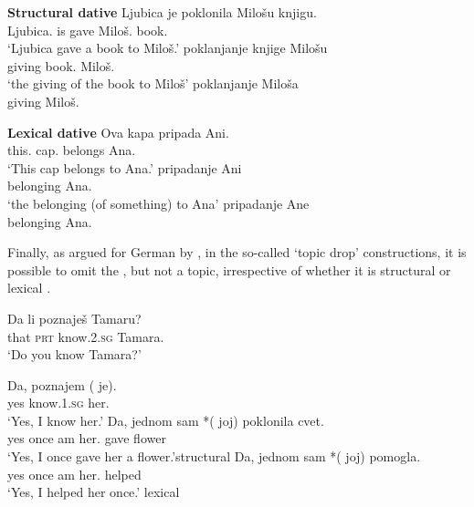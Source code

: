 \documentclass[output=paper,
modfonts,
newtxmath,
hidelinks
]{langscibook}
\begin{document}
\ea \textbf{Structural dative}
\ea \gll Ljubica je poklonila Milošu knjigu.\\
Ljubica.\nomm{} is gave Miloš.\datt{} book.\accc\\
\glt `Ljubica gave a book to Miloš.'
\ex \gll poklanjanje knjige Milošu\\
giving book.\genn{} Miloš.\datt\\
\glt `the giving of the book to Miloš'\label{ex22b}
\ex\label{ex22c} \gll poklanjanje Miloša\\
giving Miloš.\genn\\
\z \z \z

\ea \textbf{Lexical dative}\label{ex23}
\ea\gll Ova kapa pripada Ani.\\
this.\nomm{} cap.\nomm{} belongs Ana.\datt\\
\glt `This cap belongs to Ana.'
\ex\gll pripadanje Ani\\
belonging Ana.\datt\\
\glt `the belonging (of something) to Ana'
\ex\gll pripadanje Ane\\
belonging Ana.\genn\\
\z \z \z


\noindent Finally, as argued for German by \citet{sternefeld85,bayeretal01,mcfadden04}, in the so-called `topic drop' constructions, it is possible to omit the \accc{} , but not a \datt{} topic, irrespective of whether it is structural  or lexical .

\ea\gll Da li poznaješ Tamaru?\\
that \textsc{prt} know.\textsc{2.sg} Tamara.\accc\\
\glt `Do you know Tamara?'
\z

\ea 
\ea\label{ex25a}\gll Da, poznajem (\hspace{-2pt} je).\\
yes know.\textsc{1.sg} {} her.\accc\\
\glt `Yes, I know her.'
\ex\label{ex25b}\gll Da, jednom sam *(\hspace{-2pt} joj) poklonila cvet.\\
yes once am {} her.\datt{} gave flower\\
\glt `Yes, I once gave her a flower.'\hfill structural \datt
\ex\label{ex25c}\gll Da, jednom sam *(\hspace{-2pt} joj) pomogla.\\
yes once am {} her.\datt{} helped\\
\glt `Yes, I helped her once.' \hfill lexical \datt 	
\z \z
\end{document}
